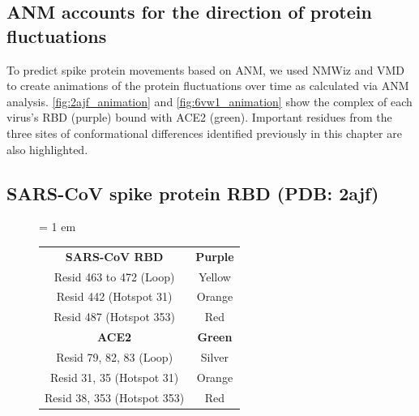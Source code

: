 \FloatBarrier
{}
\subsection{ANM accounts for the direction of protein fluctuations}

To predict spike protein movements based on ANM, we used NMWiz and VMD to create animations of the protein fluctuations over time as calculated via ANM analysis. \autoref{fig:2ajf_animation} and \autoref{fig:6vw1_animation} show the complex of each virus's RBD (purple) bound with ACE2 (green). Important residues from the three sites of conformational differences identified previously in this chapter are also highlighted.

\FloatBarrier
{}
\subsection{SARS-CoV spike protein RBD (PDB: 2ajf)}

\begin{figure}[h]
	\centering
	\tabcolsep = 1 em
	\mySfFamily
	\begin{tabular}{c c }
		\textbf{SARS-CoV RBD} & \textbf{Purple} \\
		Resid 463 to 472 (Loop)  & Yellow \\
		Resid 442 (Hotspot 31)  & Orange \\
		Resid 487 (Hotspot 353)  & Red \\
		\textbf{ACE2}  & \textbf{Green} \\
		Resid 79, 82, 83 (Loop) & Silver \\
		Resid 31, 35 (Hotspot 31) & Orange \\
		Resid 38, 353 (Hotspot 353) & Red \\
	\end{tabular}
	\caption{}
	\label{fig:2ajf_B&F_table}
\end{figure}

